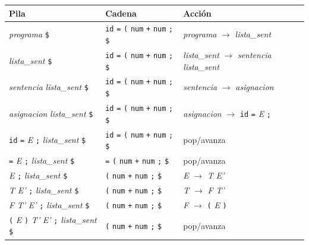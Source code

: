 \documentclass[12pt]{article}
\newcommand{\nt}[1]{\textit{#1}}
\begin{document}
\begin{table}[!htbp]
\centering\footnotesize
\renewcommand{\arraystretch}{1.08}
\begin{tabular}{@{}>{\raggedright\arraybackslash}p{5.0cm} >{\raggedright\arraybackslash}p{3.7cm} >{\raggedright\arraybackslash}p{5.6cm}@{}}
\toprule
\textbf{Pila} & \textbf{Cadena} & \textbf{Acción} \\
\midrule
\nt{programa} \texttt{\$} & \texttt{id} \texttt{=} \texttt{(} \texttt{num} \texttt{+} \texttt{num} \texttt{;} \texttt{\$} & \nt{programa} $\rightarrow$ \nt{lista\_sent} \\
\nt{lista\_sent} \texttt{\$} & \texttt{id} \texttt{=} \texttt{(} \texttt{num} \texttt{+} \texttt{num} \texttt{;} \texttt{\$} & \nt{lista\_sent} $\rightarrow$ \nt{sentencia} \nt{lista\_sent} \\
\nt{sentencia} \nt{lista\_sent} \texttt{\$} & \texttt{id} \texttt{=} \texttt{(} \texttt{num} \texttt{+} \texttt{num} \texttt{;} \texttt{\$} & \nt{sentencia} $\rightarrow$ \nt{asignacion} \\
\nt{asignacion} \nt{lista\_sent} \texttt{\$} & \texttt{id} \texttt{=} \texttt{(} \texttt{num} \texttt{+} \texttt{num} \texttt{;} \texttt{\$} & \nt{asignacion} $\rightarrow$ \texttt{id} \texttt{=} \nt{E} \texttt{;} \\
\texttt{id} \texttt{=} \nt{E} \texttt{;} \nt{lista\_sent} \texttt{\$} & \texttt{id} \texttt{=} \texttt{(} \texttt{num} \texttt{+} \texttt{num} \texttt{;} \texttt{\$} & pop/avanza \\
\texttt{=} \nt{E} \texttt{;} \nt{lista\_sent} \texttt{\$} & \texttt{=} \texttt{(} \texttt{num} \texttt{+} \texttt{num} \texttt{;} \texttt{\$} & pop/avanza \\
\nt{E} \texttt{;} \nt{lista\_sent} \texttt{\$} & \texttt{(} \texttt{num} \texttt{+} \texttt{num} \texttt{;} \texttt{\$} & \nt{E} $\rightarrow$ \nt{T} \nt{E'} \\
\nt{T} \nt{E'} \texttt{;} \nt{lista\_sent} \texttt{\$} & \texttt{(} \texttt{num} \texttt{+} \texttt{num} \texttt{;} \texttt{\$} & \nt{T} $\rightarrow$ \nt{F} \nt{T'} \\
\nt{F} \nt{T'} \nt{E'} \texttt{;} \nt{lista\_sent} \texttt{\$} & \texttt{(} \texttt{num} \texttt{+} \texttt{num} \texttt{;} \texttt{\$} & \nt{F} $\rightarrow$ \texttt{(} \nt{E} \texttt{)} \\
\texttt{(} \nt{E} \texttt{)} \nt{T'} \nt{E'} \texttt{;} \nt{lista\_sent} \texttt{\$} & \texttt{(} \texttt{num} \texttt{+} \texttt{num} \texttt{;} \texttt{\$} & pop/avanza \\

\end{tabular}
\end{table}
\end{document}
